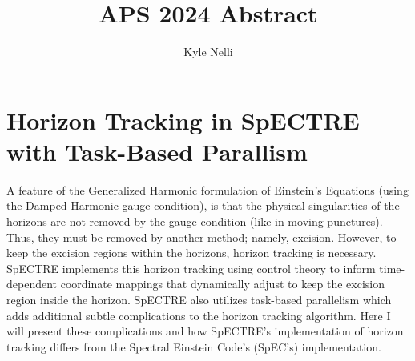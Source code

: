 \documentclass[12pt]{article}
\title{APS 2024 Abstract}
\author{Kyle Nelli}
\begin{document}
\maketitle

\section*{Horizon Tracking in SpECTRE with Task-Based Parallism}

A feature of the Generalized Harmonic formulation of Einstein's Equations (using the Damped Harmonic gauge condition), is that the physical singularities of the horizons are not removed by the gauge condition (like in moving punctures). Thus, they must be removed by another method; namely, excision. However, to keep the excision regions within the horizons, horizon tracking is necessary. SpECTRE implements this horizon tracking using control theory to inform time-dependent coordinate mappings that dynamically adjust to keep the excision region inside the horizon. SpECTRE also utilizes task-based parallelism which adds additional subtle complications to the horizon tracking algorithm. Here I will present these complications and how SpECTRE's implementation of horizon tracking differs from the Spectral Einstein Code's (SpEC's) implementation.
\end{document}
